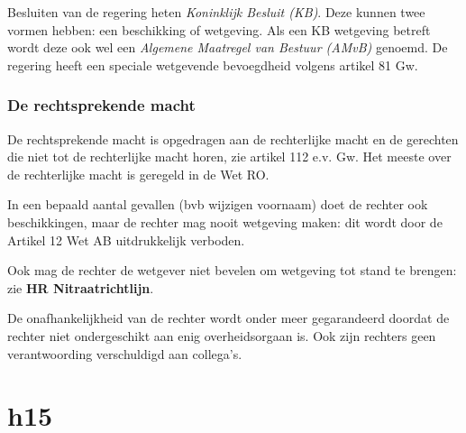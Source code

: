 \documentclass{article}
\begin{document}
Besluiten van de regering heten \emph{Koninklijk Besluit (KB)}. Deze kunnen twee 
vormen hebben: een beschikking of wetgeving. Als een KB wetgeving betreft wordt deze 
ook wel een \emph{Algemene Maatregel van Bestuur (AMvB)} genoemd. De regering 
heeft een speciale wetgevende bevoegdheid volgens artikel 81 Gw.

\subsubsection{De rechtsprekende macht}

De rechtsprekende macht is opgedragen aan de rechterlijke macht en de gerechten 
die niet tot de rechterlijke macht horen, zie artikel 112 e.v. Gw. Het meeste 
over de rechterlijke macht is geregeld in de Wet RO. 

In een bepaald aantal gevallen (bvb wijzigen voornaam) doet de rechter ook 
beschikkingen, maar de rechter mag nooit wetgeving maken: dit wordt door de
Artikel 12 Wet AB uitdrukkelijk verboden.

Ook mag de rechter de wetgever niet bevelen om wetgeving tot stand te brengen:
zie \textbf{HR Nitraatrichtlijn}.

De onafhankelijkheid van de rechter wordt onder meer gegarandeerd doordat de
rechter niet ondergeschikt aan enig overheidsorgaan is. Ook zijn rechters geen
verantwoording verschuldigd aan collega's. 



\section{h15}
\label{h15}
\end{document}

